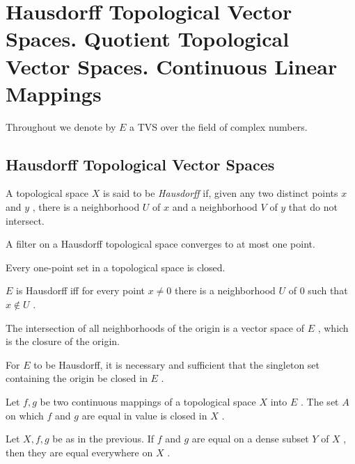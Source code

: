 \section{Hausdorff Topological Vector Spaces. Quotient Topological Vector Spaces. Continuous Linear Mappings}

Throughout we denote by $ E $ a TVS over the field of complex numbers.

\subsection{Hausdorff Topological Vector Spaces}

\indent A topological space $ X $ is said to be \textit{Hausdorff} if, given any two distinct points $ x $ and $ y $ , there is a neighborhood $ U $ of $ x $ and a neighborhood $ V $ of $ y $ that do not intersect.

\begin{thm}
	A filter on a Hausdorff topological space converges to at most one point.
\end{thm}

\begin{cor}
	Every one-point set in a topological space is closed.
\end{cor}

\begin{prop}
	$ E $ is Hausdorff iff for every point $ x \neq 0 $ there is a neighborhood $ U $ of 0 such that $ x \notin U $ .
\end{prop}

\begin{prop}
	The intersection of all neighborhoods of the origin is a vector space of $ E $ , which is the closure of the origin.
\end{prop}

\begin{cor}
	For $ E $ to be Hausdorff, it is necessary and sufficient that the singleton set containing the origin be closed in $ E $ .
\end{cor}

\begin{prop}
	Let $ f,g $ be two continuous mappings of a topological space $ X $ into $ E $ . The set $ A $ on which $ f $ and $ g $ are equal in value is closed in $ X $ .
\end{prop}

\begin{prop}
	Let $ X, f, g $ be as in the previous. If $ f $ and $ g $ are equal on a dense subset $ Y $ of $ X $ , then they are equal everywhere on $ X $ .
\end{prop}

